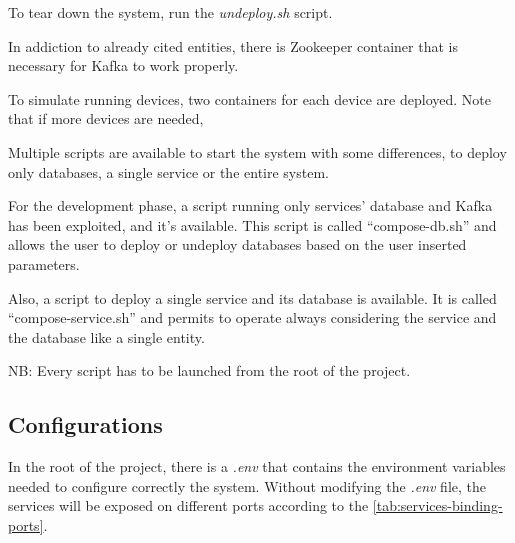 \documentclass{scrartcl}
\begin{document}
    To tear down the system, run the \textit{undeploy.sh} script.

    In addiction to already cited entities, there is Zookeeper container that is necessary for Kafka to work properly.

    To simulate running devices, two containers for each device are deployed.
    Note that if more devices are needed,

    Multiple scripts are available to start the system with some differences, to deploy only databases, a single service or the entire system.

    For the development phase, a script running only services' database and Kafka has been exploited, and it's available.
    This script is called ``compose-db.sh'' and allows the user to deploy or undeploy databases based on the user inserted parameters.

    Also, a script to deploy a single service and its database is available.
    It is called ``compose-service.sh'' and permits to operate always considering the service and the database like a single entity.

    NB: Every script has to be launched from the root of the project.

    \subsection{Configurations}
    In the root of the project, there is a \textit{.env} that contains the environment variables needed to configure
    correctly the system.
    Without modifying the \textit{.env} file, the services will be exposed on different ports according to the \cref{tab:services-binding-ports}.
\end{document}
